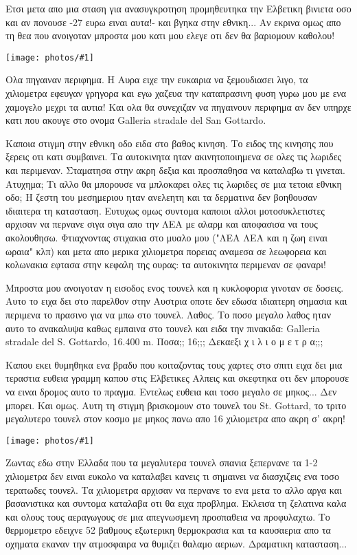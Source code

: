 \documentclass[]{book}
\newcommand\photo[1]{\noindent\texttt{[image: photos/\#1]}}
\begin{document}
Ετσι μετα απο μια σταση για ανασυγκροτηση προμηθευτηκα την Ελβετικη βινιετα οσο και αν πονουσε -27 ευρω ειναι αυτα!- και βγηκα στην εθνικη...
Αν εκρινα ομως απο τη θεα που ανοιγοταν μπροστα μου κατι μου ελεγε οτι δεν θα βαριομουν καθολου!

\photo{37.jpg}

Ολα πηγαιναν περιφημα. Η Αυρα ειχε την ευκαιρια να ξεμουδιασει λιγο, τα χιλιομετρα εφευγαν γρηγορα και εγω χαζευα την καταπρασινη φυση γυρω μου με ενα χαμογελο μεχρι τα αυτια! Και ολα θα συνεχιζαν να πηγαινουν περιφημα αν δεν υπηρχε κατι που ακουγε στο ονομα Galleria stradale del San Gottardo. 

Καποια στιγμη στην εθνικη οδο ειδα στο βαθος κινηση. Το ειδος της κινησης που ξερεις οτι κατι συμβαινει. Τα αυτοκινητα ηταν ακινητοποιημενα σε ολες τις λωριδες και περιμεναν. Σταματησα στην ακρη δεξια και προσπαθησα να καταλαβω τι γινεται. Ατυχημα; 
Τι αλλο θα μπορουσε να μπλοκαρει ολες τις λωριδες σε μια τετοια εθνικη οδο; Η ζεστη του μεσημεριου ηταν ανελεητη και τα δερματινα δεν βοηθουσαν ιδιαιτερα τη κατασταση. 
Ευτυχως ομως συντομα καποιοι αλλοι μοτοσυκλετιστες αρχισαν να περνανε σιγα σιγα απο την ΛΕΑ με αλαρμ και αποφασισα να τους ακολουθησω. Φτιαχνοντας στιχακια στο μυαλο μου ("ΛΕΑ ΛΕΑ και η ζωη ειναι ωραια" κλπ) και μετα απο μερικα χιλιομετρα πορειας αναμεσα σε λεωφορεια και κολωνακια εφτασα στην κεφαλη της ουρας: τα αυτοκινητα περιμεναν σε φαναρι! 

Μπροστα μου ανοιγοταν η εισοδος ενος τουνελ και η κυκλοφορια γινοταν σε δοσεις. Αυτο το ειχα δει στο παρελθον στην Αυστρια οποτε δεν εδωσα ιδιαιτερη σημασια και περιμενα το πρασινο για να μπω στο τουνελ. Λαθος.
Το ποσο μεγαλο λαθος ηταν αυτο το ανακαλυψα καθως εμπαινα στο τουνελ και ειδα την πινακιδα: Galleria stradale del S. Gottardo, 16.400 m. Ποσα;; 16;;; Δεκαεξι χ ι λ ι ο μ ε τ ρ α;;;

Καπου εκει θυμηθηκα ενα βραδυ που κοιταζοντας τους χαρτες στο σπιτι ειχα δει μια τεραστια ευθεια γραμμη καπου στις Ελβετικες Αλπεις και σκεφτηκα οτι δεν μπορουσε να ειναι δρομος αυτο το πραγμα. Εντελως ευθεια και τοσο μεγαλο σε μηκος... Δεν μπορει. 
Και ομως. Αυτη τη στιγμη βρισκομουν στο τουνελ του St. Gottard, το τριτο μεγαλυτερο τουνελ στον κοσμο με μηκος πανω απο 16 χιλιομετρα απο ακρη σ' ακρη!

\photo{38.jpg}

Ζωντας εδω στην Ελλαδα που τα μεγαλυτερα τουνελ σπανια ξεπερνανε τα 1-2 χιλιομετρα δεν ειναι ευκολο να καταλαβει κανεις τι σημαινει να διασχιζεις ενα τοσο τερατωδες τουνελ. 
Τα χιλιομετρα αρχισαν να περνανε το ενα μετα το αλλο αργα και βασανιστικα και συντομα καταλαβα οτι θα ειχα προβλημα. Εκλεισα τη ζελατινα καλα και ολους τους αεραγωγους σε μια απεγνωσμενη προσπαθεια να προφυλαχτω. Το θερμομετρο εδειχνε 52 βαθμους εξωτερικη θερμοκρασια και τα καυσαερια απο τα οχηματα εκαναν την ατμοσφαιρα να θυμιζει θαλαμο αεριων. Δραματικη κατασταση...
\end{document}
